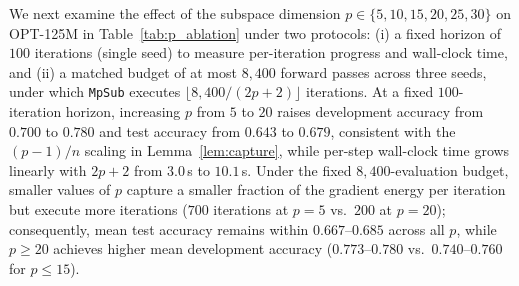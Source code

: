 \documentclass[smallextended]{svjour3}
\begin{document}
We next examine the effect of the subspace dimension $p \in \{5, 10, \allowbreak 15, \allowbreak 20, \allowbreak 25, \allowbreak 30\}$ on OPT-125M in Table~\ref{tab:p_ablation} under two protocols: (i) a fixed horizon of $100$ iterations (single seed) to measure per-iteration progress and wall-clock time, and (ii) a matched budget of at most $8{,}400$ forward passes across three seeds, under which \texttt{MpSub} executes $\lfloor 8{,}400/(2p+2)\rfloor$ iterations. At a fixed $100$-iteration horizon, increasing $p$ from $5$ to $20$ raises development accuracy from $0.700$ to $0.780$ and test accuracy from $0.643$ to $0.679$, consistent with the $(p-1)/n$ scaling in Lemma~\ref{lem:capture}, while per-step wall-clock time grows linearly with $2p+2$ from $3.0$\,s to $10.1$\,s. Under the fixed $8{,}400$-evaluation budget, smaller values of $p$ capture a smaller fraction of the gradient energy per iteration but execute more iterations ($700$ iterations at $p=5$ vs.\ $200$ at $p=20$); consequently, mean test accuracy remains within $0.667$--$0.685$ across all $p$, while $p \ge 20$ achieves higher mean development accuracy ($0.773$--$0.780$ vs.\ $0.740$--$0.760$ for $p \le 15$).
\end{document}
